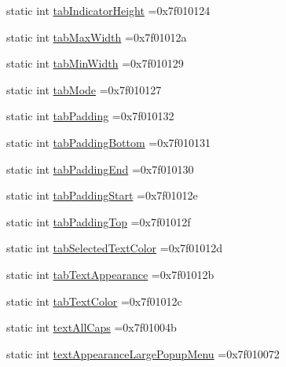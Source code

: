 \begin{DoxyCompactItemize}
\item 
static int \hyperlink{classandroid_1_1support_1_1v7_1_1mediarouter_1_1R_1_1attr_a6e43238d9de23b53c1c96f5fae8205d7}{tab\+Indicator\+Height} =0x7f010124
\item 
static int \hyperlink{classandroid_1_1support_1_1v7_1_1mediarouter_1_1R_1_1attr_a5d37021f678dae9aba1c7ecb8fc25235}{tab\+Max\+Width} =0x7f01012a
\item 
static int \hyperlink{classandroid_1_1support_1_1v7_1_1mediarouter_1_1R_1_1attr_ad7f198acb179f92ba3cb636e16e779d2}{tab\+Min\+Width} =0x7f010129
\item 
static int \hyperlink{classandroid_1_1support_1_1v7_1_1mediarouter_1_1R_1_1attr_a598c6a873d7dba4fecfaefe13727745c}{tab\+Mode} =0x7f010127
\item 
static int \hyperlink{classandroid_1_1support_1_1v7_1_1mediarouter_1_1R_1_1attr_ac68d44cf9810708b8ea458f8e156fa24}{tab\+Padding} =0x7f010132
\item 
static int \hyperlink{classandroid_1_1support_1_1v7_1_1mediarouter_1_1R_1_1attr_acc5b736693f1ab432a5ce0a3ee4d4b82}{tab\+Padding\+Bottom} =0x7f010131
\item 
static int \hyperlink{classandroid_1_1support_1_1v7_1_1mediarouter_1_1R_1_1attr_af11cb22ecb52dbd2b662fba62abac03a}{tab\+Padding\+End} =0x7f010130
\item 
static int \hyperlink{classandroid_1_1support_1_1v7_1_1mediarouter_1_1R_1_1attr_a46e385e70f6d519145f8f6c01da91116}{tab\+Padding\+Start} =0x7f01012e
\item 
static int \hyperlink{classandroid_1_1support_1_1v7_1_1mediarouter_1_1R_1_1attr_aa6eee4f776b2db8b059c557010911559}{tab\+Padding\+Top} =0x7f01012f
\item 
static int \hyperlink{classandroid_1_1support_1_1v7_1_1mediarouter_1_1R_1_1attr_a72d9cff66ac0341f5746840927dcd013}{tab\+Selected\+Text\+Color} =0x7f01012d
\item 
static int \hyperlink{classandroid_1_1support_1_1v7_1_1mediarouter_1_1R_1_1attr_ab402c331d81c2362a8853eb204ebc309}{tab\+Text\+Appearance} =0x7f01012b
\item 
static int \hyperlink{classandroid_1_1support_1_1v7_1_1mediarouter_1_1R_1_1attr_ac6c22cc3afe53aa6685979988be4035f}{tab\+Text\+Color} =0x7f01012c
\item 
static int \hyperlink{classandroid_1_1support_1_1v7_1_1mediarouter_1_1R_1_1attr_a3512dcd83093488c2c75e79b3685e5a2}{text\+All\+Caps} =0x7f01004b
\item 
static int \hyperlink{classandroid_1_1support_1_1v7_1_1mediarouter_1_1R_1_1attr_aee9155740aa9815abf21bed7daf09131}{text\+Appearance\+Large\+Popup\+Menu} =0x7f010072

\end{DoxyCompactItemize}
